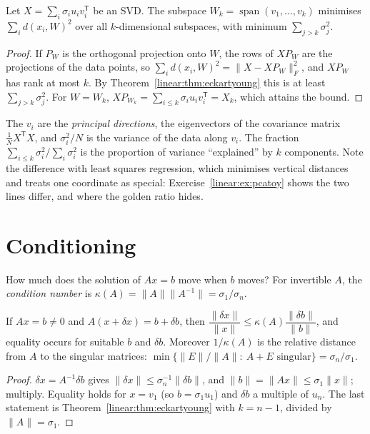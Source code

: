 \begin{theorem}\label{linear:thm:pca}
Let $X=\sum_i\sigma_iu_iv_i^{\mathsf T}$ be an SVD. The subspace $W_k=\operatorname{span}(v_1,\dots,v_k)$ minimises
$\sum_id(x_i,W)^2$ over all $k$-dimensional subspaces, with minimum $\sum_{j>k}\sigma_j^2$.
\end{theorem}
\begin{proof}
If $P_W$ is the orthogonal projection onto $W$, the rows of $XP_W$ are the projections of the data points, so
$\sum_id(x_i,W)^2=\|X-XP_W\|_F^2$, and $XP_W$ has rank at most $k$. By Theorem~\ref{linear:thm:eckartyoung} this is at least
$\sum_{j>k}\sigma_j^2$. For $W=W_k$, $XP_{W_k}=\sum_{i\le k}\sigma_iu_iv_i^{\mathsf T}=X_k$, which attains the bound.
\end{proof}

The $v_i$ are the \emph{principal directions}, the eigenvectors of the covariance matrix $\frac1NX^{\mathsf T}X$, and
$\sigma_i^2/N$ is the variance of the data along $v_i$. The fraction $\sum_{i\le k}\sigma_i^2/\sum_i\sigma_i^2$ is the
proportion of variance ``explained'' by $k$ components. Note the difference with least squares regression, which
minimises vertical distances and treats one coordinate as special: Exercise~\ref{linear:ex:pcatoy} shows the two lines differ, and
where the golden ratio hides.

\section{Conditioning}

How much does the solution of $Ax=b$ move when $b$ moves? For invertible $A$, the \emph{condition number} is
$\kappa(A)=\|A\|\|A^{-1}\|=\sigma_1/\sigma_n$.

\begin{proposition}\label{linear:prop:condition}
If $Ax=b\ne0$ and $A(x+\delta x)=b+\delta b$, then $\dfrac{\|\delta x\|}{\|x\|}\le\kappa(A)\dfrac{\|\delta b\|}{\|b\|}$, and equality
occurs for suitable $b$ and $\delta b$. Moreover $1/\kappa(A)$ is the relative distance from $A$ to the singular matrices:
$\min\{\|E\|/\|A\|:\ A+E\text{ singular}\}=\sigma_n/\sigma_1$.
\end{proposition}
\begin{proof}
$\delta x=A^{-1}\delta b$ gives $\|\delta x\|\le\sigma_n^{-1}\|\delta b\|$, and $\|b\|=\|Ax\|\le\sigma_1\|x\|$; multiply. Equality
holds for $x=v_1$ (so $b=\sigma_1u_1$) and $\delta b$ a multiple of $u_n$. The last statement is Theorem~\ref{linear:thm:eckartyoung}
with $k=n-1$, divided by $\|A\|=\sigma_1$.
\end{proof}

